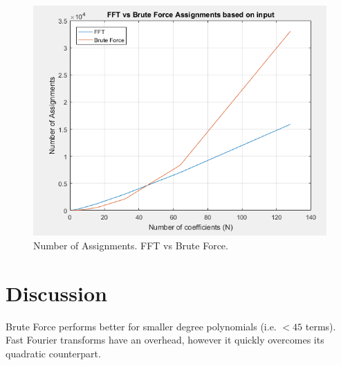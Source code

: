 \documentclass[12pt]{article}
\begin{document}
        \begin{figure}[H]
            \centerline{\includegraphics[scale=0.5]{images/BruteVSFFT_ZoomIn}}
            \caption{Number of Assignments. FFT vs Brute Force.}
            \label{fig:assignZoom}
        \end{figure}
        \section{Discussion}
        \indent\par{Brute Force performs better for smaller degree polynomials (i.e. $< 45$ terms). Fast Fourier transforms have an overhead, however it quickly overcomes its quadratic counterpart.}
        
        
        

    
\end{document}
